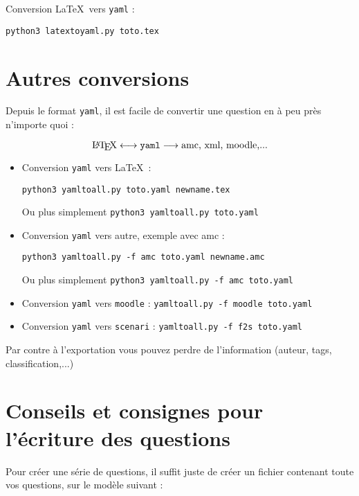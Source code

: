 \documentclass[12pt,a4paper]{article}
\begin{document}
\bigskip

Conversion \LaTeX\ vers \texttt{yaml} : \\
  \centerline{\texttt{python3 latextoyaml.py toto.tex}}

\section{Autres conversions}
Depuis le format \texttt{yaml}, il est facile de convertir une question en à peu près n'importe quoi :

$$\text{\LaTeX} \longleftrightarrow \text{\texttt{yaml}} \longrightarrow \text{amc, xml, moodle,...}$$

\begin{itemize}
  
   \item Conversion \texttt{yaml} vers \LaTeX\ : \\
   \centerline{\texttt{python3 yamltoall.py toto.yaml newname.tex}} 
   
   Ou plus simplement \texttt{python3 yamltoall.py toto.yaml}
  
   \item Conversion \texttt{yaml} vers autre, exemple avec amc : \\
   \centerline{\texttt{python3 yamltoall.py -f amc toto.yaml newname.amc}} 
   Ou plus simplement \texttt{python3 yamltoall.py -f amc toto.yaml} 
   
    \item Conversion \texttt{yaml} vers \texttt{moodle} : 
    \texttt{yamltoall.py -f moodle toto.yaml}
    
    \item Conversion \texttt{yaml} vers \texttt{scenari} : 
    \texttt{yamltoall.py -f f2s toto.yaml}    
\end{itemize}

Par contre à l'exportation vous pouvez perdre de l'information (auteur, tags, classification,...)



\section{Conseils et consignes pour l'écriture des questions}


Pour créer une série de questions, il suffit juste de créer un fichier contenant toute vos questions, sur le modèle suivant :
\end{document}
